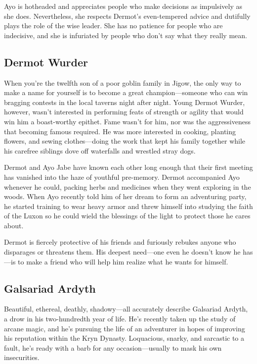 \documentclass[a4paper, 11pt, bg=full, twocolumn, nooutline]{dndbook}
\begin{document}
Ayo is hotheaded and appreciates people who make decisions as impulsively as she does. Nevertheless, she respects Dermot's even-tempered advice and dutifully plays the role of the wise leader. She has no patience for people who are indecisive, and she is infuriated by people who don't say what they really mean.

\subsection{Dermot Wurder}


When you're the twelfth son of a poor goblin family in Jigow, the only way to make a name for yourself is to become a great champion---someone who can win bragging contests in the local taverns night after night. Young Dermot Wurder, however, wasn't interested in performing feats of strength or agility that would win him a boast-worthy epithet. Fame wasn't for him, nor was the aggressiveness that becoming famous required. He was more interested in cooking, planting flowers, and sewing clothes---doing the work that kept his family together while his carefree siblings dove off waterfalls and wrestled stray dogs.

Dermot and Ayo Jabe have known each other long enough that their first meeting has vanished into the haze of youthful pre-memory. Dermot accompanied Ayo whenever he could, packing herbs and medicines when they went exploring in the woods. When Ayo recently told him of her dream to form an adventuring party, he started training to wear heavy armor and threw himself into studying the faith of the Luxon so he could wield the blessings of the light to protect those he cares about.

Dermot is fiercely protective of his friends and furiously rebukes anyone who disparages or threatens them. His deepest need---one even he doesn't know he has---is to make a friend who will help him realize what he wants for himself.

\subsection{Galsariad Ardyth}


Beautiful, ethereal, deathly, shadowy---all accurately describe Galsariad Ardyth, a drow in his two-hundredth year of life. He's recently taken up the study of arcane magic, and he's pursuing the life of an adventurer in hopes of improving his reputation within the Kryn Dynasty. Loquacious, snarky, and sarcastic to a fault, he's ready with a barb for any occasion---usually to mask his own insecurities.
\end{document}
